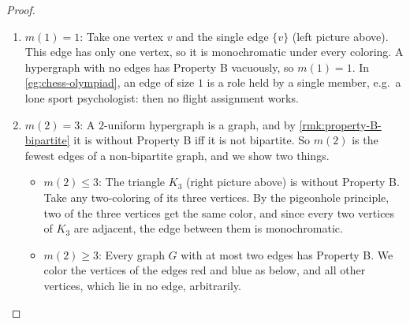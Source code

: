 \begin{proof}
    \hfill
    \begin{enumerate}[(1), beginpenalty=10000]
        \item \(m(1) = 1\): Take one vertex \(v\) and the single edge \(\{v\}\) (left picture above). This edge has only one vertex, so it is monochromatic under every coloring. A hypergraph with no edges has Property B vacuously, so \(m(1) = 1\). In \autoref{eg:chess-olympiad}, an edge of size \(1\) is a role held by a single member, e.g.\ a lone sport psychologist: then no flight assignment works.

        \item \(m(2) = 3\): A \(2\)-uniform hypergraph is a graph, and by \autoref{rmk:property-B-bipartite} it is without Property B iff it is not bipartite. So \(m(2)\) is the fewest edges of a non-bipartite graph, and we show two things.
        \begin{itemize}
            \item \(m(2) \le 3\): The triangle \(K_3\) (right picture above) is without Property B. Take any two-coloring of its three vertices. By the pigeonhole principle, two of the three vertices get the same color, and since every two vertices of \(K_3\) are adjacent, the edge between them is monochromatic.
            \item \(m(2) \ge 3\): Every graph \(G\) with at most two edges has Property B. We color the vertices of the edges red and blue as below, and all other vertices, which lie in no edge, arbitrarily.
            \begin{center}
\end{center}
\end{itemize}
\end{enumerate}
\end{proof}
